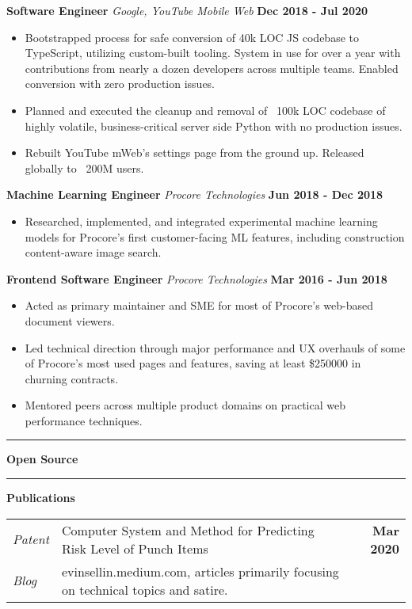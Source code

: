 \documentclass[10pt]{letter}
\begin{document}
\hspace*{2px}
\textbf{Software Engineer} 
\textit{Google, YouTube Mobile Web}
\hfill 
\textbf{Dec 2018 - Jul 2020}
\begin{itemize}
  \item Bootstrapped process for safe conversion of 40k LOC JS codebase to TypeScript, utilizing custom-built tooling. System in use for over a year with contributions from nearly a dozen developers across multiple teams. Enabled conversion with zero production issues.
  \item Planned and executed the cleanup and removal of ~100k LOC codebase of highly volatile, business-critical server side Python with no production issues.
  \item Rebuilt YouTube mWeb's settings page from the ground up. Released globally to ~200M users.
\end{itemize}

\hspace*{2px}
\textbf{Machine Learning Engineer}
\textit{Procore Technologies}
\hfill
\textbf{Jun 2018 - Dec 2018}
\begin{itemize}
  \item Researched, implemented, and integrated experimental machine learning models for Procore’s first customer-facing ML features, including construction content-aware image search.
\end{itemize}

\hspace*{2px}
\textbf{Frontend Software Engineer}
\textit{Procore Technologies}
\hfill 
\textbf{Mar 2016 - Jun 2018}
\begin{itemize}
  \item Acted as primary maintainer and SME for most of Procore's web-based document viewers.
  \item Led technical direction through major performance and UX overhauls of some of Procore’s most used pages and features, saving at least \$250000 in churning contracts.
  \item Mentored peers across multiple product domains on practical web performance techniques.
\end{itemize}

\vspace{4px}
\hrule
\textbf{Open Source}

\vspace{4px}
\hrule
\textbf{Publications}

\begin{tabular}{llr}
\textit{Patent} & Computer System and Method for Predicting Risk Level of Punch Items & \textbf{Mar 2020} \\
\textit{Blog} & evinsellin.medium.com, articles primarily focusing on technical topics and satire.
\end{tabular}
\end{document}
